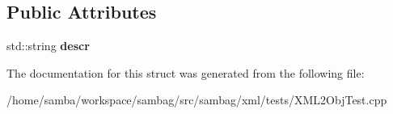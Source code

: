\subsection*{Public Attributes}
\begin{DoxyCompactItemize}
\item 
\hypertarget{struct_object_b_a1e6125e5a6a68ece3bb3892b4112f8bc}{
std::string {\bfseries descr}}
\label{struct_object_b_a1e6125e5a6a68ece3bb3892b4112f8bc}

\end{DoxyCompactItemize}


The documentation for this struct was generated from the following file:\begin{DoxyCompactItemize}
\item 
/home/samba/workspace/sambag/src/sambag/xml/tests/XML2ObjTest.cpp\end{DoxyCompactItemize}
